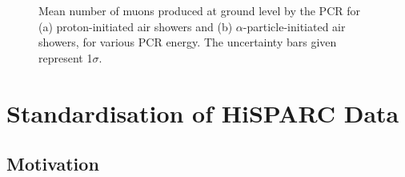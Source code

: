 \begin{figure}
	\centering
	\qquad
	\caption{Mean number of muons produced at ground level by the PCR for (a) proton-initiated air showers and (b) $\alpha$-particle-initiated air showers, for various PCR energy. The uncertainty bars given represent 1$\sigma$.}
	\label{fig:shower_muons}
\end{figure}



\section{Standardisation of HiSPARC Data}\label{sec:HS_standardisation}

\subsection{Motivation}

